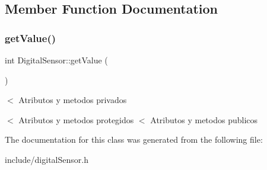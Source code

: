 \subsection{Member Function Documentation}
\mbox{\label{classDigitalSensor_ad89d8eb0cc6ed9458cfab2b90bf8d306}} 
\subsubsection{\texorpdfstring{get\+Value()}{getValue()}}
{\footnotesize\ttfamily int Digital\+Sensor\+::get\+Value (\begin{DoxyParamCaption}{ }\end{DoxyParamCaption})\hspace{0.3cm}{\ttfamily [protected]}}



$<$ Atributos y metodos privados 

$<$ Atributos y metodos protegidos $<$ Atributos y metodos publicos 

The documentation for this class was generated from the following file\+:\begin{DoxyCompactItemize}
\item 
include/digital\+Sensor.\+h\end{DoxyCompactItemize}
